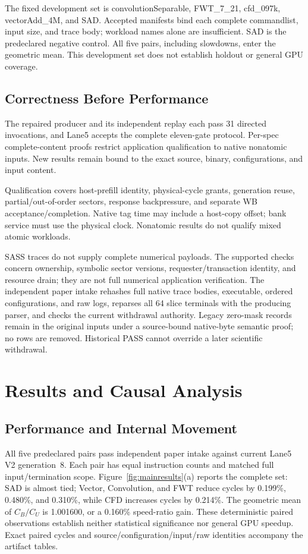 \documentclass[conference,letterpaper]{IEEEtran}
\begin{document}
The fixed development set is convolutionSeparable, FWT\_7\_21, cfd\_097k, vectorAdd\_4M, and SAD. Accepted manifests bind each complete commandlist, input size, and trace body; workload names alone are insufficient. SAD is the predeclared negative control. All five pairs, including slowdowns, enter the geometric mean. This development set does not establish holdout or general GPU coverage.

\subsection{Correctness Before Performance}
The repaired producer and its independent replay each pass 31 directed invocations, and Lane5 accepts the complete eleven-gate protocol. Per-spec complete-content proofs restrict application qualification to native nonatomic inputs. New results remain bound to the exact source, binary, configurations, and input content.

Qualification covers host-prefill identity, physical-cycle grants, generation reuse, partial/out-of-order sectors, response backpressure, and separate WB acceptance/completion. Native tag time may include a host-copy offset; bank service must use the physical clock. Nonatomic results do not qualify mixed atomic workloads.

SASS traces do not supply complete numerical payloads. The supported checks concern ownership, symbolic sector versions, requester/transaction identity, and resource drain; they are not full numerical application verification. The independent paper intake rehashes full native trace bodies, executable, ordered configurations, and raw logs, reparses all 64 slice terminals with the producing parser, and checks the current withdrawal authority. Legacy zero-mask records remain in the original inputs under a source-bound native-byte semantic proof; no rows are removed. Historical PASS cannot override a later scientific withdrawal.

\section{Results and Causal Analysis}
\subsection{Performance and Internal Movement}
All five predeclared pairs pass independent paper intake against current Lane5 V2 generation~8. Each pair has equal instruction counts and matched full input/termination scope. Figure~\ref{fig:mainresults}(a) reports the complete set: SAD is almost tied; Vector, Convolution, and FWT reduce cycles by 0.199\%, 0.480\%, and 0.310\%, while CFD increases cycles by 0.214\%. The geometric mean of $C_B/C_U$ is 1.001600, or a 0.160\% speed-ratio gain. These deterministic paired observations establish neither statistical significance nor general GPU speedup. Exact paired cycles and source/configuration/input/raw identities accompany the artifact tables.
\end{document}
